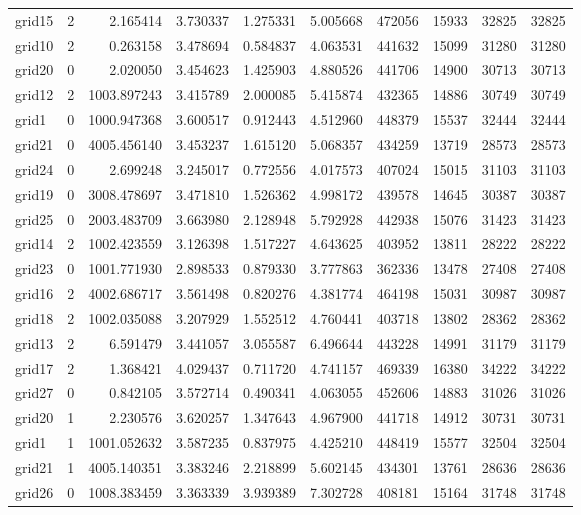 \documentclass[../../../thesis.tex]{subfiles}
\begin{document}
\begin{longtable}{|l|r|r|r|r|r|r|r|r|r|}
grid15 & 2 & 2.165414 & 3.730337 & 1.275331 & 5.005668 & 472056 & 15933 & 32825 & 32825 \\
grid10 & 2 & 0.263158 & 3.478694 & 0.584837 & 4.063531 & 441632 & 15099 & 31280 & 31280 \\
grid20 & 0 & 2.020050 & 3.454623 & 1.425903 & 4.880526 & 441706 & 14900 & 30713 & 30713 \\
grid12 & 2 & 1003.897243 & 3.415789 & 2.000085 & 5.415874 & 432365 & 14886 & 30749 & 30749 \\
grid1 & 0 & 1000.947368 & 3.600517 & 0.912443 & 4.512960 & 448379 & 15537 & 32444 & 32444 \\
grid21 & 0 & 4005.456140 & 3.453237 & 1.615120 & 5.068357 & 434259 & 13719 & 28573 & 28573 \\
grid24 & 0 & 2.699248 & 3.245017 & 0.772556 & 4.017573 & 407024 & 15015 & 31103 & 31103 \\
grid19 & 0 & 3008.478697 & 3.471810 & 1.526362 & 4.998172 & 439578 & 14645 & 30387 & 30387 \\
grid25 & 0 & 2003.483709 & 3.663980 & 2.128948 & 5.792928 & 442938 & 15076 & 31423 & 31423 \\
grid14 & 2 & 1002.423559 & 3.126398 & 1.517227 & 4.643625 & 403952 & 13811 & 28222 & 28222 \\
grid23 & 0 & 1001.771930 & 2.898533 & 0.879330 & 3.777863 & 362336 & 13478 & 27408 & 27408 \\
grid16 & 2 & 4002.686717 & 3.561498 & 0.820276 & 4.381774 & 464198 & 15031 & 30987 & 30987 \\
grid18 & 2 & 1002.035088 & 3.207929 & 1.552512 & 4.760441 & 403718 & 13802 & 28362 & 28362 \\
grid13 & 2 & 6.591479 & 3.441057 & 3.055587 & 6.496644 & 443228 & 14991 & 31179 & 31179 \\
grid17 & 2 & 1.368421 & 4.029437 & 0.711720 & 4.741157 & 469339 & 16380 & 34222 & 34222 \\
grid27 & 0 & 0.842105 & 3.572714 & 0.490341 & 4.063055 & 452606 & 14883 & 31026 & 31026 \\
grid20 & 1 & 2.230576 & 3.620257 & 1.347643 & 4.967900 & 441718 & 14912 & 30731 & 30731 \\
grid1 & 1 & 1001.052632 & 3.587235 & 0.837975 & 4.425210 & 448419 & 15577 & 32504 & 32504 \\
grid21 & 1 & 4005.140351 & 3.383246 & 2.218899 & 5.602145 & 434301 & 13761 & 28636 & 28636 \\
grid26 & 0 & 1008.383459 & 3.363339 & 3.939389 & 7.302728 & 408181 & 15164 & 31748 & 31748 \\

\end{longtable}
\end{document}
